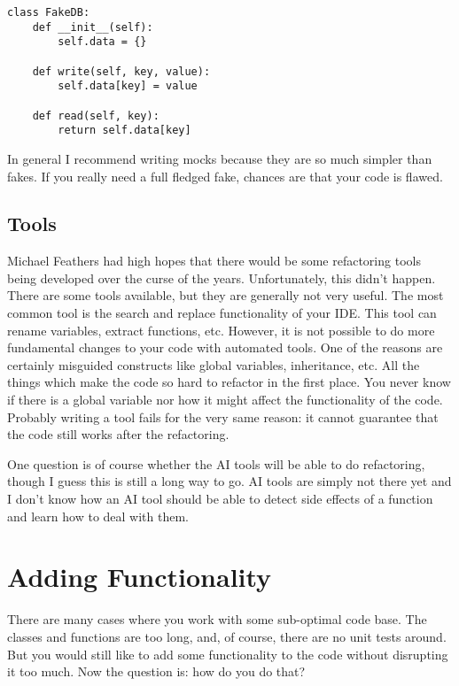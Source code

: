 \begin{programcode}{}
\begin{verbatim}
class FakeDB:
    def __init__(self):
        self.data = {}

    def write(self, key, value):
        self.data[key] = value

    def read(self, key):
        return self.data[key]
\end{verbatim}
\end{programcode}


In general I recommend writing mocks because they are so much simpler than fakes. If you really need a full fledged fake, chances are that your code is flawed.

\section{Tools}

Michael Feathers had high hopes that there would be some refactoring tools being developed over the curse of the years. Unfortunately, this didn't happen. There are some tools available, but they are generally not very useful. The most common tool is the search and replace functionality of your IDE. This tool can rename variables, extract functions, etc. However, it is not possible to do more fundamental changes to your code with automated tools. One of the reasons are certainly misguided constructs like global variables, inheritance, etc. All the things which make the code so hard to refactor in the first place. You never know if there is a global variable nor how it might affect the functionality of the code. Probably writing a tool fails for the very same reason: it cannot guarantee that the code still works after the refactoring.

One question is of course whether the AI tools will be able to do refactoring, though I guess this is still a long way to go. AI tools are simply not there yet and I don't know how an AI tool should be able to detect side effects of a function and learn how to deal with them.

\chapter{Adding Functionality}

There are many cases where you work with some sub-optimal code base. The classes and functions are too long, and, of course, there are no unit tests around. But you would still like to add some functionality to the code without disrupting it too much. Now the question is: how do you do that?

